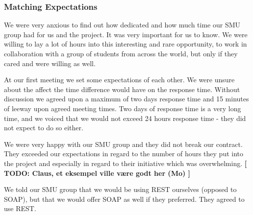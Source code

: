 \subsubsection{Matching Expectations}
We were very anxious to find out how dedicated and how much time our SMU group had for us and the project. It was very important for us to know. We were willing to lay a lot of hours into this interesting and rare opportunity, to work in collaboration with a group of students from across the world, but only if they cared and were willing as well.

At our first meeting we set some expectations of each other. We were unsure about the affect the time difference would have on the response time. Without discussion we agreed upon a maximum of two days response time and 15 minutes of leeway upon agreed meeting times. Two days of response time is a very long time, and we voiced that we would not exceed 24 hours response time - they did not expect to do so either.

We were very happy with our SMU group and they did not break our contract. They exceeded our expectations in regard to the number of hours they put into the project and especially in regard to their initiative which was overwhelming. \textbf{[ TODO: Claus, et eksempel ville være godt her (Mo) ]}

We told our SMU group that we would be using REST ourselves (opposed to SOAP), but that we would offer SOAP as well if they preferred. They agreed to use REST.
